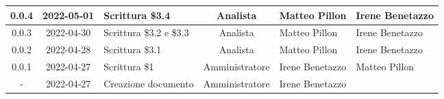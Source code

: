 \begin{center}
\begin{longtable}{ |c|c|p{8em}|c|m{5em}|m{5em}| }
	\hline
    0.0.4 & 2022-05-01 & Scrittura \$3.4 & Analista & Matteo \newline Pillon & Irene \newline Benetazzo\\
	\hline
    0.0.3 & 2022-04-30 & Scrittura \newline \$3.2 e \$3.3 & Analista & Matteo \newline Pillon & Irene \newline Benetazzo\\
	\hline
    0.0.2 & 2022-04-28 & Scrittura \$3.1 & Analista & Matteo \newline Pillon & Irene \newline Benetazzo\\
	\hline
	0.0.1 & 2022-04-27 & Scrittura \$1 & Amministratore & Irene \newline Benetazzo & Matteo \newline Pillon\\
	\hline
	- & 2022-04-27 & Creazione \newline documento & Amministratore & Irene \newline Benetazzo & \\
	\hline
	\end{longtable}
	\end{center}
	\newpage